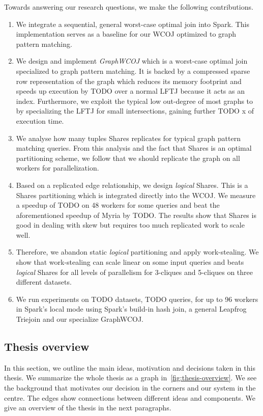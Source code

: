 Towards answering our research questions, we make the following contributions.
\begin{enumerate}
    \item We integrate a sequential, general worst-case optimal join into Spark.
    This implementation serves as a baseline for our \textsc{WCOJ} optimized to graph pattern matching.
    \item We design and implement \textit{GraphWCOJ} which is a worst-case optimal join specialized to graph pattern matching.
    It is backed by a compressed sparse row representation of the graph which reduces its memory footprint and speeds up execution by TODO over a normal \textsc{LFTJ} because it acts as an index. %
    Furthermore, we exploit the typical low out-degree of most graphs to by specializing the \textsc{LFTJ} for small intersections,
    gaining further TODO x of execution time. %
    \item We analyse how many tuples Shares replicates for typical graph pattern matching queries.
    From this analysis and the fact that Shares is an optimal partitioning scheme, we follow that we should replicate the graph on all workers for parallelization.
    \item Based on a replicated edge relationship, we design \textit{logical} Shares.
    This is a Shares partitioning which is integrated directly into the \textsc{WCOJ}.
    We measure a speedup of TODO on 48 workers for some queries and beat the aforementioned speedup of Myria by TODO.
    The results show that Shares is good in dealing with skew but requires too much replicated work to scale well.
    \item Therefore, we abandon static \textit{logical} partitioning and apply work-stealing.
    We show that work-stealing can scale linear on some input queries and beats \textit{logical} Shares for all levels of parallelism for 3-cliques and 5-cliques on three different datasets.
    \item We run experiments on TODO datasets, TODO queries, for up to 96 workers in Spark's local mode using Spark's build-in hash join,
    a general Leapfrog Triejoin and our specialize GraphWCOJ.
\end{enumerate}

\subsection{Thesis overview} \label{subsec:thesis-idea}
In this section, we outline the main ideas, motivation and decisions taken in this thesis.
We summarize the whole thesis as a graph in~\cref{fig:thesis-overview}.
We see the background that motivates our decision in the corners and our system in the centre.
The edges show connections between different ideas and components.
We give an overview of the thesis in the next paragraphs.

